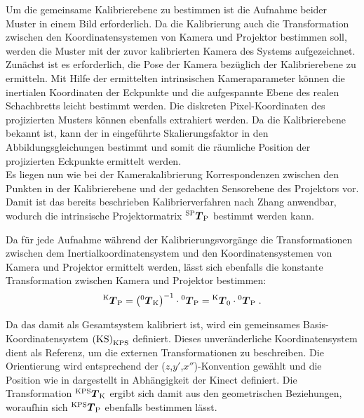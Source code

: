 \prever{
}

Um die gemeinsame Kalibrierebene zu bestimmen ist die Aufnahme beider Muster in einem Bild erforderlich. Da die Kalibrierung auch die Transformation zwischen den Koordinatensystemen von Kamera und Projektor bestimmen soll, werden die Muster mit der zuvor kalibrierten Kamera des Systems aufgezeichnet.\\

Zunächst ist es erforderlich, die Pose der Kamera bezüglich der Kalibrierebene zu ermitteln. Mit Hilfe der ermittelten intrinsischen Kameraparameter können die inertialen Koordinaten der Eckpunkte und die aufgespannte Ebene des realen Schachbretts leicht bestimmt werden. Die diskreten Pixel-Koordinaten des projizierten Musters können ebenfalls extrahiert werden. Da die Kalibrierebene bekannt ist, kann der in  eingeführte Skalierungsfaktor in den Abbildungsgleichungen bestimmt und somit die räumliche Position der projizierten Eckpunkte ermittelt werden.\\

Es liegen nun wie bei der Kamerakalibrierung Korrespondenzen zwischen den Punkten in der Kalibrierebene und der gedachten Sensorebene des Projektors vor. Damit ist das bereits beschrieben Kalibrierverfahren nach Zhang anwendbar, wodurch die intrinsische Projektormatrix ${^{\mathrm{SP}}\mbox{\boldmath{$T$}}_{\mathrm{P}}}$ bestimmt werden kann.\\

\prever{
}

Da für jede Aufnahme während der Kalibrierungsvorgänge die Transformationen zwischen dem Inertialkoordinatensystem und den Koordinatensystemen von Kamera und Projektor ermittelt werden, lässt sich ebenfalls die konstante Transformation zwischen Kamera und Projektor bestimmen:
%
\begin{equation}
{^{\mathrm{K}}\mbox{\boldmath{$T$}}_{\mathrm{P}}} = \left( {^{\mathrm{0}}\mbox{\boldmath{$T$}}_{\mathrm{K}}} \right)^{-1} \cdot {^{\mathrm{0}}\mbox{\boldmath{$T$}}_{\mathrm{P}}} = {^{\mathrm{K}}\mbox{\boldmath{$T$}}_{\mathrm{0}}} \cdot {^{\mathrm{0}}\mbox{\boldmath{$T$}}_{\mathrm{P}}} \; \text{.}
\end{equation}

Da das \kps{} damit als Gesamtsystem kalibriert ist, wird ein gemeinsames Basis-Koordinatensystem ${\mathrm{(KS)}}_{\mathrm{KPS}}$ definiert. Dieses unveränderliche Koordinatensystem dient als Referenz, um die externen Transformationen zu beschreiben. Die Orientierung wird entsprechend der ($z$,$y'$,$x''$)-Konvention gewählt und die Position wie in  dargestellt in Abhängigkeit der Kinect definiert. Die Transformation ${^{\mathrm{KPS}}\mbox{\boldmath{$T$}}_{\mathrm{K}}}$ ergibt sich damit aus den geometrischen Beziehungen, woraufhin sich ${^{\mathrm{KPS}}\mbox{\boldmath{$T$}}_{\mathrm{P}}}$ ebenfalls bestimmen lässt.


